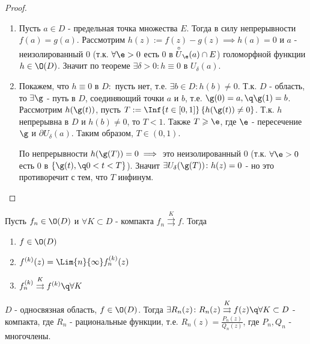 \begin{proof}
 \begin{enumerate}
   \item Пусть $a\in D$ - предельная точка множества $E$. Тогда в силу непрерывности $f(a)=g(a)$. Рассмотрим $h(z):=f(z)-g(z)\implies h(a)=0$ и $a$ - неизолированный 0 (т.к. $\forall \e>0$ есть 0 в $\overset{\circ}{U}_\e(a)\cap E$) голоморфной функции $h\in\O(D)$. Значит по теореме $\exists \delta>0\colon h\equiv 0$ в $U_\delta(a)$. 
   \item Покажем, что $h\equiv 0$ в $D\colon$ пусть нет, т.е. $\exists b\in D\colon h(b)\neq0$. Т.к. $D$ - область, то $\exists \g$ - путь в $D$, соединяющий точки $a$ и $b$, т.е. $\g(0)=a,\q \g(1)=b$. Рассмотрим $h(\g(t))$, пусть $T:=\Inf{t\in[0,1]} \left\{h(\g(t))\neq0\right\}$. Т.к. $h$ непрерывна в $D$ и $h(b)\neq 0$, то $T<1$. Также $T\geqslant \e$, где $\e$ - пересечение $\g$ и $\partial U_\delta(a)$. Таким образом, $T\in(0,1)$.

   По непрерывности $h(\g(T))=0\implies$ это неизолированный 0 (т.к. $\forall \e>0$ есть 0 в $\left\{\g(t),\q 0<t<T\right\}$). Значит $\exists U_\delta(\g(T))\colon h(z)=0$ - но это противоречит с тем, что $T$ инфинум.
 \end{enumerate}
\end{proof}
\begin{theorem}[(Вейерштрасса)]
  Пусть $f_n\in\O(D)$ и $\forall K\subset D$ - компакта $f_n\overset{K}{\rightrightarrows}f$. Тогда
  \begin{enumerate}
    \item $f\in \O(D)$
    \item $f^{(k)}(z)=\Lim{n}{\infty}f_n^{(k)}(z)$
    \item $f_n^{(k)}\overset{K}{\rightrightarrows}f^{(k)}\q\forall K$ 
  \end{enumerate}
\end{theorem}
\begin{theorem}[(Рунге)]
  $D$ - односвязная область, $f\in\O(D)$. Тогда $\exists R_n(z)\colon R_n(z)\overset{K}{\rightrightarrows}f(z)\q\forall K\subset D$ - компакта, где $R_n$ - рациональные функции, т.е. $R_n(z)=\frac{P_n(z)}{Q_n(z)}$, где $P_n,Q_n$ - многочлены. 
\end{theorem}
